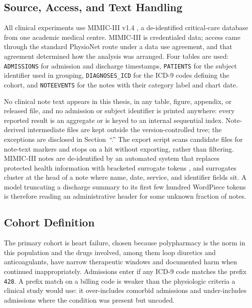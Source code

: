 \subsection{Source, Access, and Text Handling}

All clinical experiments use MIMIC-III v1.4 \citep{johnson2016mimic}, a de-identified critical-care
database from one academic medical centre. MIMIC-III is credentialed data; access came through the
standard PhysioNet route under a data use agreement, and that agreement determined how the analysis
was arranged. Four tables are used: \texttt{ADMISSIONS} for admission and discharge timestamps,
\texttt{PATIENTS} for the subject identifier used in grouping, \texttt{DIAGNOSES\_ICD} for the
ICD-9 codes defining the cohort, and \texttt{NOTEEVENTS} for the notes with their category label
and chart date.

No clinical note text appears in this thesis, in any table, figure, appendix, or released file,
and no admission or subject identifier is printed anywhere: every reported result is an aggregate
or is keyed to an internal sequential index. Note-derived intermediate files are kept
outside the version-controlled tree; the exceptions are disclosed in
Section~``.'' The export script scans candidate files for note-text markers and stops on a hit without
exporting, rather than filtering. MIMIC-III notes are de-identified by an automated
system that replaces protected health information with bracketed surrogate tokens
\citep{neamatullah2008deid}, and surrogates cluster at the head of a note where name, date, service,
and identifier fields sit. A model truncating a discharge summary to its first few hundred WordPiece
tokens is therefore reading an administrative header for some unknown fraction of notes. 

\subsection{Cohort Definition}

The primary cohort is heart failure, chosen because polypharmacy is the norm in this population and
the drugs involved, among them loop diuretics and anticoagulants, have narrow therapeutic windows and
documented harm when continued inappropriately. Admissions enter if any ICD-9 code matches the prefix
\texttt{428}. A prefix match on a billing code is weaker than the physiologic criteria a clinical
study would use: it over-includes comorbid admissions and under-includes admissions where the
condition was present but uncoded.

